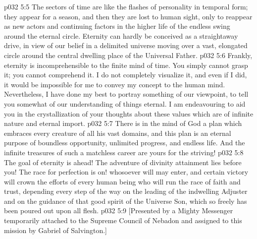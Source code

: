 \vs p032 5:5 The sectors of time are like the flashes of personality in temporal form; they appear for a season, and then they are lost to human sight, only to reappear as new actors and continuing factors in the higher life of the endless swing around the eternal circle. Eternity can hardly be conceived as a straightaway drive, in view of our belief in a delimited universe moving over a vast, elongated circle around the central dwelling place of the Universal Father.
\vs p032 5:6 Frankly, eternity is incomprehensible to the finite mind of time. You simply cannot grasp it; you cannot comprehend it. I do not completely visualize it, and even if I did, it would be impossible for me to convey my concept to the human mind. Nevertheless, I have done my best to portray something of our viewpoint, to tell you somewhat of our understanding of things eternal. I am endeavouring to aid you in the crystallization of your thoughts about these values which are of infinite nature and eternal import.
\vs p032 5:7 \pc There is in the mind of God a plan which embraces every creature of all his vast domains, and this plan is an eternal purpose of boundless opportunity, unlimited progress, and endless life. And the infinite treasures of such a matchless career are yours for the striving!
\vs p032 5:8 The goal of eternity is ahead! The adventure of divinity attainment lies before you! The race for perfection is on! whosoever will may enter, and certain victory will crown the efforts of every human being who will run the race of faith and trust, depending every step of the way on the leading of the indwelling Adjuster and on the guidance of that good spirit of the Universe Son, which so freely has been poured out upon all flesh.
\vsetoff
\vs p032 5:9 [Presented by a Mighty Messenger temporarily attached to the Supreme Council of Nebadon and assigned to this mission by Gabriel of Salvington.]
\quizlink
